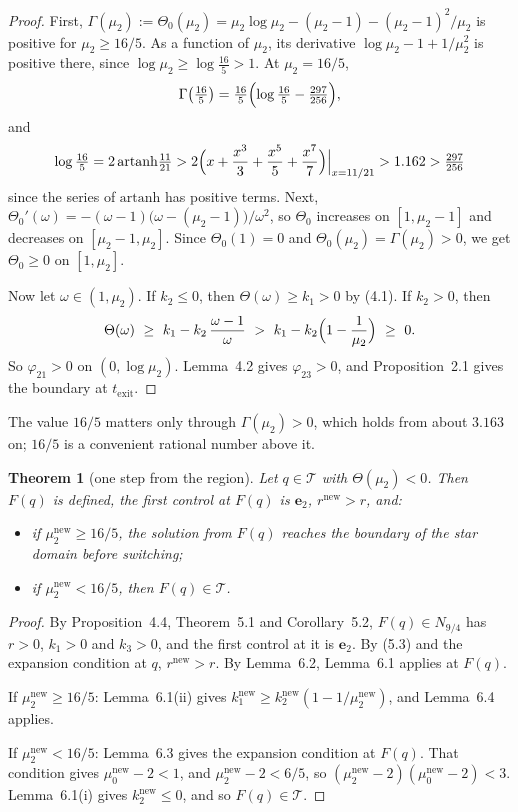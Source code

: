 \documentclass[11pt,a4paper]{article}
\theoremstyle{plain}
\newtheorem{theorem}{Theorem}[section]
\theoremstyle{definition}
\theoremstyle{remark}
\newcommand{\ep}{\mathbf{e}}
\newcommand{\T}{\mathcal{T}}
\newcommand{\nw}{^{\mathrm{new}}}
\newcommand{\tex}{t_{\mathrm{exit}}}
\begin{document}
\begin{proof}
First, $\Gamma(\mu_2):=\Theta_0(\mu_2)=\mu_2\log\mu_2-(\mu_2-1)-(\mu_2-1)^2/\mu_2$ is positive for
$\mu_2\ge16/5$. As a function of $\mu_2$, its derivative $\log\mu_2-1+1/\mu_2^2$ is positive
there, since $\log\mu_2\ge\log\frac{16}{5}>1$. At $\mu_2=16/5$,
\[
\Gamma\bigl(\tfrac{16}5\bigr)=\tfrac{16}{5}\Bigl(\log\tfrac{16}{5}-\tfrac{297}{256}\Bigr),
\]
and
\[
\log\tfrac{16}{5}=2\,\mathrm{artanh}\tfrac{11}{21}
>2\Bigl(x+\frac{x^3}3+\frac{x^5}5+\frac{x^7}7\Bigr)\Big|_{x=11/21}>1.162>\tfrac{297}{256}
\]
since the series of $\mathrm{artanh}$ has positive terms. Next,
$\Theta_0'(\omega)=-(\omega-1)\bigl(\omega-(\mu_2-1)\bigr)/\omega^2$, so $\Theta_0$ increases on
$[1,\mu_2-1]$ and decreases on $[\mu_2-1,\mu_2]$. Since $\Theta_0(1)=0$ and
$\Theta_0(\mu_2)=\Gamma(\mu_2)>0$, we get $\Theta_0\ge0$ on $[1,\mu_2]$.

Now let $\omega\in(1,\mu_2)$. If $k_2\le0$, then $\Theta(\omega)\ge k_1>0$ by (4.1). If $k_2>0$,
then
\[
\Theta(\omega)\ \ge\ k_1-k_2\,\frac{\omega-1}{\omega}\ >\ k_1-k_2\Bigl(1-\frac1{\mu_2}\Bigr)\ \ge\ 0 .
\]
So $\varphi_{21}>0$ on $(0,\log\mu_2)$. Lemma~4.2 gives $\varphi_{23}>0$, and Proposition~2.1 gives
the boundary at $\tex$.
\end{proof}

The value $16/5$ matters only through $\Gamma(\mu_2)>0$, which holds from about $3.163$ on;
$16/5$ is a convenient rational number above it.

\begin{theorem}[one step from the region]
Let $q\in\T$ with $\Theta(\mu_2)<0$. Then $F(q)$ is defined, the first control at $F(q)$ is $\ep_2$,
$r\nw>r$, and:
\begin{itemize}[itemsep=1pt]
\item if $\mu_2\nw\ge16/5$, the solution from $F(q)$ reaches the boundary of the star domain before
switching;
\item if $\mu_2\nw<16/5$, then $F(q)\in\T$.
\end{itemize}
\end{theorem}

\begin{proof}
By Proposition~4.4, Theorem~5.1 and Corollary~5.2, $F(q)\in N_{9/4}$ has $r>0$, $k_1>0$ and
$k_3>0$, and the first control at it is $\ep_2$. By (5.3) and the expansion condition at $q$,
$r\nw>r$. By Lemma~6.2, Lemma~6.1 applies at $F(q)$.

If $\mu_2\nw\ge16/5$: Lemma~6.1(ii) gives $k_1\nw\ge k_2\nw(1-1/\mu_2\nw)$, and Lemma~6.4 applies.

If $\mu_2\nw<16/5$: Lemma~6.3 gives the expansion condition at $F(q)$. That condition gives
$\mu_0\nw-2<1$, and $\mu_2\nw-2<6/5$, so $(\mu_2\nw-2)(\mu_0\nw-2)<3$. Lemma~6.1(i) gives
$k_2\nw\le0$, and so $F(q)\in\T$.
\end{proof}
\end{document}
